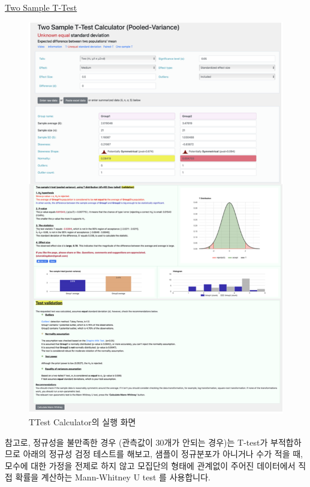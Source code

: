 \documentclass[
  letterpaper,
]{book}
\begin{document}
\href{https://www.statskingdom.com/140MeanT2eq.html}{Two Sample T-Test}

\begin{figure}[H]

{\centering \includegraphics{img/fig29.png}

}

\caption{TTest Calculator의 실행 화면}

\end{figure}%

참고로, 정규성을 불만족한 경우 (관측값이 30개가 안되는 경우)는 T-test가
부적합하므로 아래의 정규성 검정 테스트를 해보고, 샘플이 정규분포가
아니거나 수가 적을 때, 모수에 대한 가정을 전제로 하지 않고 모집단의
형태에 관계없이 주어진 데이터에서 직접 확률을 계산하는 Mann-Whitney U
test 를 사용합니다.
\end{document}
